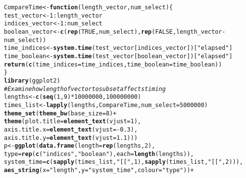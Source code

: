 \documentclass{article}\usepackage[]{graphicx}\usepackage[]{color}
\makeatletter
\newcommand{\hlnum}[1]{\textcolor[rgb]{0.686,0.059,0.569}{#1}}%
\newcommand{\hlstr}[1]{\textcolor[rgb]{0.192,0.494,0.8}{#1}}%
\newcommand{\hlcom}[1]{\textcolor[rgb]{0.678,0.584,0.686}{\textit{#1}}}%
\newcommand{\hlopt}[1]{\textcolor[rgb]{0,0,0}{#1}}%
\newcommand{\hlstd}[1]{\textcolor[rgb]{0.345,0.345,0.345}{#1}}%
\newcommand{\hlkwa}[1]{\textcolor[rgb]{0.161,0.373,0.58}{\textbf{#1}}}%
\newcommand{\hlkwb}[1]{\textcolor[rgb]{0.69,0.353,0.396}{#1}}%
\newcommand{\hlkwc}[1]{\textcolor[rgb]{0.333,0.667,0.333}{#1}}%
\newcommand{\hlkwd}[1]{\textcolor[rgb]{0.737,0.353,0.396}{\textbf{#1}}}%
\newenvironment{kframe}{%
 \def\at@end@of@kframe{}%
 \ifinner\ifhmode%
  \def\at@end@of@kframe{\end{minipage}}%
  \begin{minipage}{\columnwidth}%
 \fi\fi%
 \def\FrameCommand##1{\hskip\@totalleftmargin \hskip-\fboxsep
 \colorbox{shadecolor}{##1}\hskip-\fboxsep
     \hskip-\linewidth \hskip-\@totalleftmargin \hskip\columnwidth}%
 \MakeFramed {\advance\hsize-\width
   \@totalleftmargin\z@ \linewidth\hsize
   \@setminipage}}%
 {\par\unskip\endMakeFramed%
 \at@end@of@kframe}
\newenvironment{knitrout}{}{} %
\makeatother
\begin{document}
\begin{knitrout}
\color{fgcolor}\begin{kframe}
\begin{alltt}
 \hlstd{CompareTime} \hlkwb{<-} \hlkwa{function}\hlstd{(}\hlkwc{length_vector}\hlstd{,} \hlkwc{num_select}\hlstd{) \{}
   \hlstd{test_vector} \hlkwb{<-} \hlnum{1}\hlopt{:}\hlstd{length_vector}
   \hlstd{indices_vector} \hlkwb{<-} \hlnum{1}\hlopt{:}\hlstd{num_select}
   \hlstd{boolean_vector} \hlkwb{<-} \hlkwd{c}\hlstd{(}\hlkwd{rep}\hlstd{(}\hlnum{TRUE}\hlstd{, num_select),} \hlkwd{rep}\hlstd{(}\hlnum{FALSE}\hlstd{, length_vector}\hlopt{-}\hlstd{num_select))}
   \hlstd{time_indices} \hlkwb{<-} \hlkwd{system.time}\hlstd{(test_vector[indices_vector])[}\hlstr{"elapsed"}\hlstd{]}
   \hlstd{time_boolean} \hlkwb{<-} \hlkwd{system.time}\hlstd{(test_vector[boolean_vector])[}\hlstr{"elapsed"}\hlstd{]}
   \hlkwd{return}\hlstd{(}\hlkwd{c}\hlstd{(}\hlkwc{time_indices} \hlstd{= time_indices,} \hlkwc{time_boolean} \hlstd{= time_boolean))}
 \hlstd{\}}
 \hlkwd{library}\hlstd{(ggplot2)}
 \hlcom{# Examine how length of vector to subset affects timing}
 \hlstd{lengths} \hlkwb{<-} \hlkwd{c}\hlstd{(}\hlkwd{seq}\hlstd{(}\hlnum{1}\hlstd{,} \hlnum{9}\hlstd{)}\hlopt{*}\hlnum{10000000}\hlstd{,} \hlnum{100000000}\hlstd{)}
 \hlstd{times_list} \hlkwb{<-} \hlkwd{lapply}\hlstd{(lengths, CompareTime,} \hlkwc{num_select} \hlstd{=} \hlnum{5000000}\hlstd{)}
 \hlkwd{theme_set}\hlstd{(}\hlkwd{theme_bw}\hlstd{(}\hlkwc{base_size} \hlstd{=} \hlnum{8}\hlstd{)} \hlopt{+}
             \hlkwd{theme}\hlstd{(}\hlkwc{plot.title} \hlstd{=} \hlkwd{element_text}\hlstd{(}\hlkwc{vjust} \hlstd{=} \hlnum{1}\hlstd{),}
                   \hlkwc{axis.title.x} \hlstd{=} \hlkwd{element_text}\hlstd{(}\hlkwc{vjust} \hlstd{=} \hlopt{-}\hlnum{0.3}\hlstd{),}
                   \hlkwc{axis.title.y} \hlstd{=} \hlkwd{element_text}\hlstd{(}\hlkwc{vjust} \hlstd{=} \hlnum{1.1}\hlstd{)))}
 \hlstd{p} \hlkwb{<-} \hlkwd{ggplot}\hlstd{(}\hlkwd{data.frame}\hlstd{(}\hlkwc{length} \hlstd{=} \hlkwd{rep}\hlstd{(lengths,} \hlnum{2}\hlstd{),}
                   \hlkwc{type} \hlstd{=} \hlkwd{rep}\hlstd{(}\hlkwd{c}\hlstd{(}\hlstr{"indices"}\hlstd{,} \hlstr{"boolean"}\hlstd{),} \hlkwc{each} \hlstd{=} \hlkwd{length}\hlstd{(lengths)),}
                   \hlkwc{system_time} \hlstd{=} \hlkwd{c}\hlstd{(}\hlkwd{sapply}\hlstd{(times_list,} \hlstr{"[["}\hlstd{,} \hlnum{1}\hlstd{),} \hlkwd{sapply}\hlstd{(times_list,} \hlstr{"[["}\hlstd{,} \hlnum{2}\hlstd{))),}
             \hlkwd{aes_string}\hlstd{(}\hlkwc{x} \hlstd{=} \hlstr{"length"}\hlstd{,} \hlkwc{y} \hlstd{=} \hlstr{"system_time"}\hlstd{,} \hlkwc{colour} \hlstd{=} \hlstr{"type"}\hlstd{))} \hlopt{+}

\end{alltt}
\end{kframe}
\end{knitrout}
\end{document}
